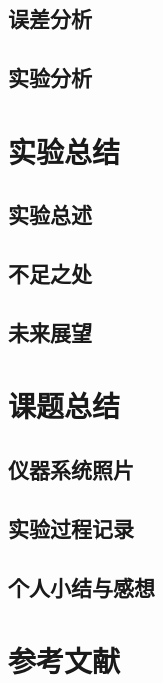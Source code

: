 \documentclass{ctexart}
\numberwithin{figure}{section}
\numberwithin{table}{section}
\begin{document}
	\subsection{误差分析}
	
	\subsection{实验分析}
	
	\newpage
	\section{实验总结}
	
	\subsection{实验总述}
	
	\subsection{不足之处}
	
	\subsection{未来展望}
	
	\newpage
	\section{课题总结}
	
	\subsection{仪器系统照片}
	
	\subsection{实验过程记录}
	
	\subsection{个人小结与感想}
	
	\newpage
	\section{参考文献}
	
	
\end{document}
